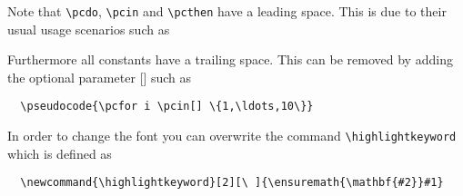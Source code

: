 \documentclass[a4paper]{report}
\begin{document}
  Note that \lstinline{\pcdo}, \lstinline{\pcin} and \lstinline{\pcthen} have a leading space. This is due to their usual usage scenarios
  such as
  \begin{center}
  \end{center}
  Furthermore all constants have a trailing space. This can be removed by adding the optional parameter [] such as
  \begin{center}
  \end{center}
  \begin{lstlisting}
  \pseudocode{\pcfor i \pcin[] \{1,\ldots,10\}}
  \end{lstlisting}
  
  In order to change the font you can overwrite the command \lstinline{\highlightkeyword} which is defined as
  \begin{lstlisting}
  \newcommand{\highlightkeyword}[2][\ ]{\ensuremath{\mathbf{#2}}#1}
  \end{lstlisting}
  
\end{document}
